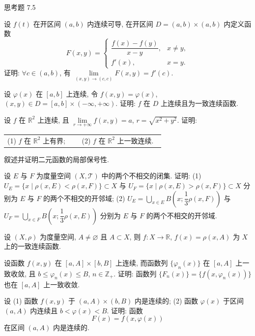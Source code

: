 \begin{exblock}{思考题 7.5}
  \item 设 $f(t)$ 在开区间 $(a, b)$ 内连续可导, 在开区间 $D = (a, b) \times (a, b)$ 内定义函数
  \[
    F(x, y) =
    \begin{cases}
      \dfrac{f(x) - f(y)}{x - y}, & x \neq y, \\[2.5mm]
      f'(x), & x = y.
    \end{cases}
  \]
  证明: $\forall c \in (a, b)$, 有 $\lim\limits_{(x, y) \to (c, c)} F(x, y) = f'(c)$.

  \item 设 $\varphi(x)$ 在 $[a, b]$ 上连续, 令 $f(x, y) = \varphi(x)$, $(x, y) \in D = [a, b] \times (-\infty, +\infty)$. 证明: $f$ 在 $D$ 上连续且为一致连续函数.

  \item 设 $f$ 在 $\mathbb{R}^{2}$ 上连续, 且 $\lim\limits_{r \to +\infty} f(x, y) = a$, $r = \sqrt{x^{2} + y^{2}}$. 证明:

  \begin{tabular}{@{}p{0.45\linewidth}p{0.50\linewidth}@{}}
    (1) $f$ 在 $\mathbb{R}^{2}$ 上有界; & (2) $f$ 在 $\mathbb{R}^{2}$ 上一致连续.
  \end{tabular}

  \item 叙述并证明二元函数的局部保号性.

  \item 设 $E$ 与 $F$ 为度量空间 $(X, \mathcal{T})$ 中的两个不相交的闭集. 证明:
  (1) $U_{E} = \{x \mid \rho(x, E) < \rho(x, F)\} \subset X$ 与 $U_{F} = \{x \mid \rho(x, E) > \rho(x, F)\} \subset X$ 分别为 $E$ 与 $F$ 的两个不相交的开邻域;
  (2) $U_{E} = \bigcup\limits_{x \in E} B\left(x; \dfrac{1}{3}\rho(x, F)\right)$ 与 $U_{F} = \bigcup\limits_{x \in F} B\left(x; \dfrac{1}{3}\rho(x, E)\right)$ 分别为 $E$ 与 $F$ 的两个不相交的开邻域.

  \item 设 $(X, \rho)$ 为度量空间, $A \neq \varnothing$ 且 $A \subset X$, 则 $f\colon X \to \mathbb{R}$, $f(x) = \rho(x, A)$ 为 $X$ 上的一致连续函数.

  \item 设函数 $f(x, y)$ 在 $[a, A] \times [b, B]$ 上连续, 而函数列 $\{\varphi_{n}(x)\}$ 在 $[a, A]$ 上一致收敛, 且 $b \leqslant \varphi_{n}(x) \leqslant B$, $n \in \mathbb{Z}_{+}$. 证明: 函数列 $\{F_{n}(x)\} = \{f(x, \varphi_{n}(x))\}$ 也在 $[a, A]$ 上一致收敛.

  \item 设 (1) 函数 $f(x, y)$ 于 $(a, A) \times (b, B)$ 内是连续的; (2) 函数 $\varphi(x)$ 于区间 $(a, A)$ 内连续且 $b < \varphi(x) < B$. 证明: 函数
  \[
    F(x) = f(x, \varphi(x))
  \]
  在区间 $(a, A)$ 内是连续的.


\end{exblock}

